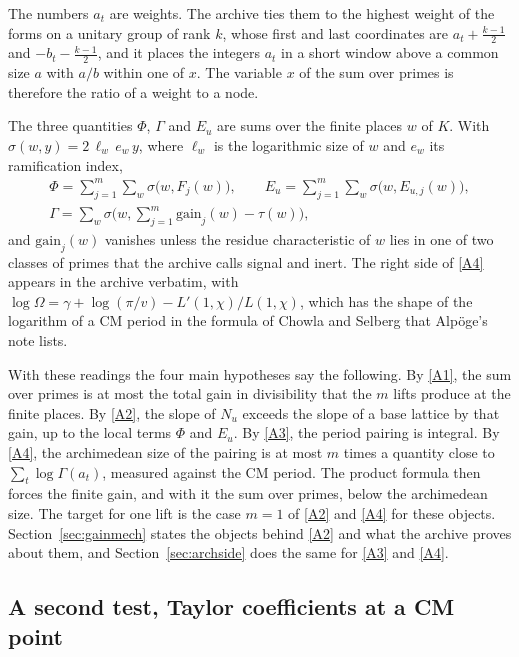 \documentclass[11pt,letterpaper]{article}
\numberwithin{equation}{section}
\begin{document}
The numbers $a_t$ are weights. The archive ties them to the highest weight of the forms on a unitary group of rank $k$, whose first and last coordinates are $a_t+\tfrac{k-1}2$ and $-b_t-\tfrac{k-1}2$, and it places the integers $a_t$ in a short window above a common size $a$ with $a/b$ within one of $x$. The variable $x$ of the sum over primes is therefore the ratio of a weight to a node.

The three quantities $\Phi$, $\Gamma$ and $E_u$ are sums over the finite places $w$ of $K$. With $\sigma(w,y)=2\,\ell_w\,e_w\,y$, where $\ell_w$ is the logarithmic size of $w$ and $e_w$ its ramification index,
\begin{gather*}
\Phi=\sum_{j=1}^m\sum_w\sigma\big(w,F_j(w)\big),\qquad
E_u=\sum_{j=1}^m\sum_w\sigma\big(w,E_{u,j}(w)\big),\\
\Gamma=\sum_w\sigma\Big(w,\sum_{j=1}^m\mathrm{gain}_j(w)-\tau(w)\Big),
\end{gather*}
and $\mathrm{gain}_j(w)$ vanishes unless the residue characteristic of $w$ lies in one of two classes of primes that the archive calls signal and inert. The right side of \eqref{A4} appears in the archive verbatim, with $\log\Omega=\gamma+\log(\pi/v)-L'(1,\chi)/L(1,\chi)$, which has the shape of the logarithm of a CM period in the formula of Chowla and Selberg that Alp\"oge's note lists.

With these readings the four main hypotheses say the following. By \eqref{A1}, the sum over primes is at most the total gain in divisibility that the $m$ lifts produce at the finite places. By \eqref{A2}, the slope of $N_u$ exceeds the slope of a base lattice by that gain, up to the local terms $\Phi$ and $E_u$. By \eqref{A3}, the period pairing is integral. By \eqref{A4}, the archimedean size of the pairing is at most $m$ times a quantity close to $\sum_t\log\Gamma(a_t)$, measured against the CM period. The product formula then forces the finite gain, and with it the sum over primes, below the archimedean size. The target for one lift is the case $m=1$ of \eqref{A2} and \eqref{A4} for these objects. Section~\ref{sec:gainmech} states the objects behind \eqref{A2} and what the archive proves about them, and Section~\ref{sec:archside} does the same for \eqref{A3} and \eqref{A4}.

\subsection{A second test, Taylor coefficients at a CM point}\label{sec:taylor}
\end{document}

